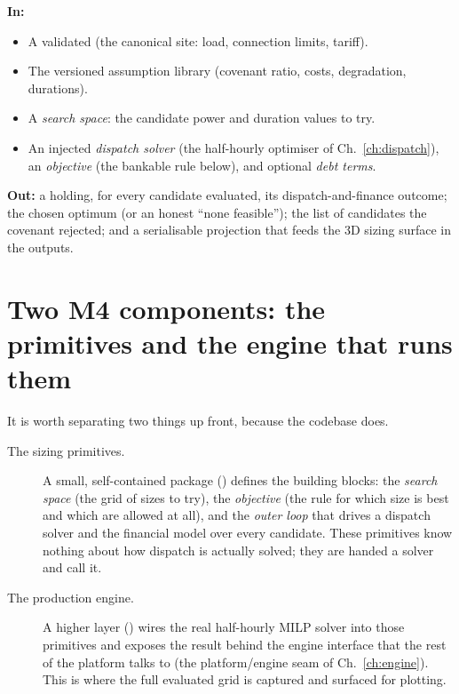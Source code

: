 \begin{contract}
\textbf{In:}
\begin{itemize}
  \item A validated  (the canonical site: load, connection limits, tariff).
  \item The versioned assumption library (covenant ratio, costs, degradation, durations).
  \item A \emph{search space}: the candidate power and duration values to try.
  \item An injected \emph{dispatch solver} (the half-hourly optimiser of Ch.~\ref{ch:dispatch}), an \emph{objective} (the bankable rule below), and optional \emph{debt terms}.
\end{itemize}
\textbf{Out:} a  holding, for every candidate evaluated, its dispatch-and-finance outcome; the chosen optimum (or an honest ``none feasible''); the list of candidates the covenant rejected; and a serialisable  projection that feeds the 3D sizing surface in the outputs.
\end{contract}

\section{Two M4 components: the primitives and the engine that runs them}

It is worth separating two things up front, because the codebase does.

\begin{description}
  \item[The sizing primitives.] A small, self-contained package () defines the building blocks: the \emph{search space} (the grid of sizes to try), the \emph{objective} (the rule for which size is best and which are allowed at all), and the \emph{outer loop} that drives a dispatch solver and the financial model over every candidate. These primitives know nothing about how dispatch is actually solved; they are handed a solver and call it.
  \item[The production engine.] A higher layer () wires the real half-hourly MILP solver into those primitives and exposes the result behind the engine interface that the rest of the platform talks to (the platform/engine seam of Ch.~\ref{ch:engine}). This is where the full evaluated grid is captured and surfaced for plotting.
\end{description}

